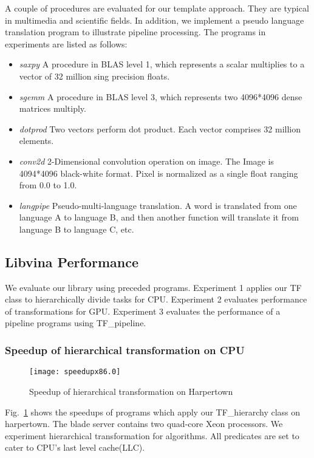 A couple of procedures are evaluated for our template approach.  They
are typical in multimedia and scientific fields. In
addition, we implement a pseudo language translation program to
illustrate pipeline processing. The programs in experiments are listed
as follows:

\begin{itemize}
\item \textit{saxpy} A procedure in BLAS level 1, which represents a
  scalar multiplies to a vector of 32 million sing precision floats.
\item \textit{sgemm} A procedure in BLAS level 3, which represents two 4096*4096 dense matrices multiply.
\item \textit{dotprod} Two vectors perform dot product. Each vector
  comprises 32 million elements.
\item \textit{conv2d} 2-Dimensional convolution operation on image.  The Image
  is 4094*4096 black-white format. Pixel is normalized as a single
  float ranging from 0.0 to 1.0.
\item \textit{langpipe} Pseudo-multi-language translation. A word is translated from one language A to language B, and then another function will translate it from language B to language C, etc.
\end{itemize}

\subsection{Libvina Performance}
We evaluate our library using preceded programs. Experiment 1 applies our TF class to hierarchically divide
tasks for CPU. Experiment 2 evaluates performance of 
transformations for GPU. Experiment 3 evaluates the
performance of a pipeline programs using TF\_pipeline.
\subsubsection{Speedup of hierarchical transformation on CPU}\label{exp:1}
\begin{figure}
\texttt{[image: speedupx86.0]}
\caption{Speedup of hierarchical transformation on Harpertown}\label{fig:spdx86}
\end{figure}

Fig.~\ref{fig:spdx86} shows the speedups of programs which apply our
TF\_hierarchy class on harpertown. The blade
server contains two quad-core Xeon
processors. We experiment hierarchical transformation for
algorithms. All predicates are set to cater to CPU's last level cache(LLC).

